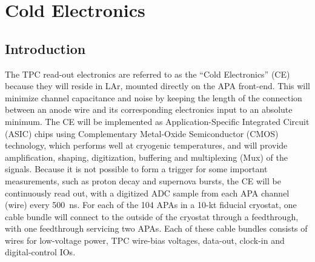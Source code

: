 \chapter{Cold Electronics}
\label{ch:ce}

%
\section{Introduction}
\label{sec:ce_intro}



The TPC read-out electronics are referred to as the ``Cold Electronics'' (CE) because they will reside in LAr,
mounted directly on the APA front-end.
This will minimize channel capacitance and noise by keeping the length of the connection between an anode wire
and its corresponding electronics input to an absolute minimum.
The CE will be implemented as Application-Specific Integrated Circuit (ASIC) chips using
Complementary Metal-Oxide Semiconductor (CMOS) technology,
which performs well at cryogenic temperatures,
and will provide amplification, shaping, digitization, buffering and multiplexing (Mux) of the signals.
Because it is not possible to form a trigger for some important measurements,
such as proton decay and supernova bursts, the CE will be continuously read out,
with a digitized ADC sample from each APA channel (wire) every 500~ns.
For each of the 104 APAs in a 10-kt fiducial cryostat, one cable bundle will connect to the outside of the cryostat through
a feedthrough, with one feedthrough servicing two APAs.
Each of these cable bundles consists of wires for low-voltage power, TPC wire-bias voltages, data-out, clock-in and
digital-control IOs.

